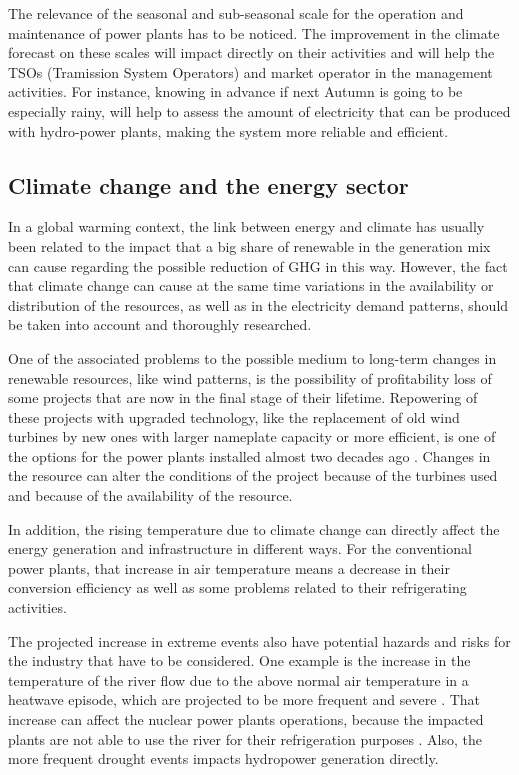 The relevance of the seasonal and sub-seasonal scale for the operation and maintenance of power plants has to be noticed. The improvement in the climate forecast on these scales will impact directly on their activities and will help the TSOs (Tramission System Operators) and market operator in the management activities. For instance, knowing in advance if next Autumn is going to be especially rainy, will help to assess the amount of electricity that can be produced with hydro-power plants, making the system more reliable and efficient.


\subsection{Climate change and the energy sector}

In a global warming context, the link between energy and climate has usually been related to the impact that a big share of renewable in the generation mix can cause regarding the possible reduction of GHG in this way. However, the fact that climate change can cause at the same time variations in the availability or distribution of the resources, as well as in the electricity demand patterns, should be taken into account and thoroughly researched. 

One of the associated problems to the possible medium to long-term changes in renewable resources, like wind patterns, is the possibility of profitability loss of some projects that are now in the final stage of their lifetime. Repowering of these projects with upgraded technology, like the replacement of old wind turbines by new ones with larger nameplate capacity or more efficient, is one of the options for the power plants installed almost two decades ago \cite*{delrio}. Changes in the resource can alter the conditions of the project because of the turbines used and because of the availability of the resource.  



In addition, the rising temperature due to climate change can directly affect the energy generation and infrastructure in different ways. For the conventional power plants, that increase in air temperature means a decrease in their conversion efficiency as well as some problems related to their refrigerating activities.

The projected increase in extreme events also have potential hazards and risks for the industry that have to be considered. One example is the increase in the temperature of the river flow due to the above normal air temperature in a heatwave episode, which are projected to be more frequent and severe \cite*{Troccoli2018}. That increase can affect the nuclear power plants operations, because the impacted plants are not able to use the river for their refrigeration purposes \cite*{Troccoli2018}. Also, the more frequent drought events impacts hydropower generation directly.  

